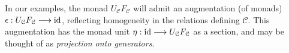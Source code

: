 \documentclass[11pt]{amsart}
\theoremstyle{plain}
\theoremstyle{definition}
\renewcommand{\to}{\longrightarrow}
\newcommand{\calW}{\mathcal{W}}
\newcommand{\calU}{\mathcal{U}}
\newcommand{\calL}{\mathcal{L}}
\newcommand{\calC}{\mathcal{C}}
\newcommand{\calV}{\mathcal{V}}
\newcommand{\calc}{\mathcal{C}}
\theoremstyle{plain}
\newcommand{\vect}[2]{\calV^{#1}_{#2}}
\newcommand{\F}{\mathbb{F}}
\newcommand{\Id}{\textup{id}}
\begin{document}
\begin{Conventions and notation}
%
%
%
%

In our examples, the monad $U_{\calC}F_{\calC}$ will admit an augmentation (of monads) $\epsilon:U_{\calC}F_{\calC}\to\Id$, reflecting homogeneity in the relations defining $\calC$. This augmentation has the monad unit $\eta:\Id\to U_{\calC}F_{\calC}$ as a section, and may be thought of as \emph{projection onto generators}.



\end{Conventions and notation}
\end{document}
